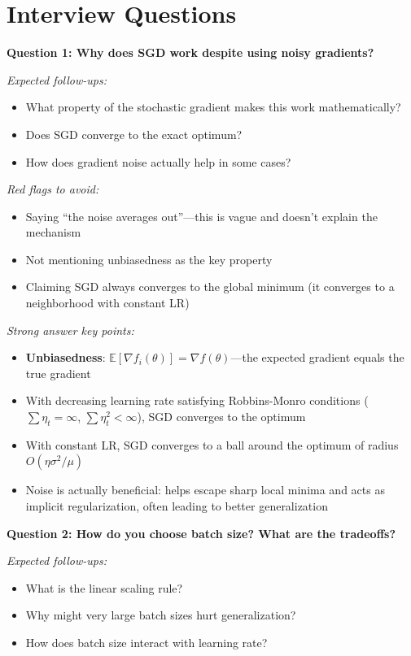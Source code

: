 \documentclass[../../main.tex]{subfiles}
\begin{document}
\section*{Interview Questions}
\begin{interviewquestions}

\textbf{Question 1: Why does SGD work despite using noisy gradients?}

\textit{Expected follow-ups:}
\begin{itemize}
    \item What property of the stochastic gradient makes this work mathematically?
    \item Does SGD converge to the exact optimum?
    \item How does gradient noise actually help in some cases?
\end{itemize}

\textit{Red flags to avoid:}
\begin{itemize}
    \item Saying ``the noise averages out''---this is vague and doesn't explain the mechanism
    \item Not mentioning unbiasedness as the key property
    \item Claiming SGD always converges to the global minimum (it converges to a neighborhood with constant LR)
\end{itemize}

\textit{Strong answer key points:}
\begin{itemize}
    \item \textbf{Unbiasedness}: $\mathbb{E}[\nabla f_i(\theta)] = \nabla f(\theta)$---the expected gradient equals the true gradient
    \item With decreasing learning rate satisfying Robbins-Monro conditions ($\sum \eta_t = \infty$, $\sum \eta_t^2 < \infty$), SGD converges to the optimum
    \item With constant LR, SGD converges to a ball around the optimum of radius $O(\eta \sigma^2 / \mu)$
    \item Noise is actually beneficial: helps escape sharp local minima and acts as implicit regularization, often leading to better generalization
\end{itemize}

\vspace{0.5em}
\textbf{Question 2: How do you choose batch size? What are the tradeoffs?}

\textit{Expected follow-ups:}
\begin{itemize}
    \item What is the linear scaling rule?
    \item Why might very large batch sizes hurt generalization?
    \item How does batch size interact with learning rate?
\end{itemize}


\end{interviewquestions}
\end{document}
